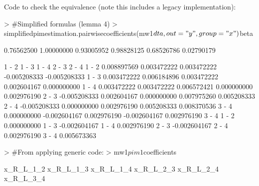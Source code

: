 \documentclass[12pt]{article}
\begin{document}
Code to check the equivalence (note this includes a legacy implementation):
\begin{Schunk}
\begin{Sinput}
> 	#Simplified formulas (lemma 4)
> 	simplifiedpimestimation.pairwisecoefficients(mw1$dta, out="y", group="x")$beta
\end{Sinput}
\begin{Soutput}
[1] 0.76562500 1.00000000 0.93005952 0.98828125 0.68526786 0.02790179
\end{Soutput}
\begin{Soutput}
             1 - 2        1 - 3       1 - 4        2 - 3        2 - 4
1 - 2  0.008897569  0.003472222 0.003472222 -0.005208333 -0.005208333
1 - 3  0.003472222  0.006184896 0.003472222  0.002604167  0.000000000
1 - 4  0.003472222  0.003472222 0.006572421  0.000000000  0.002976190
2 - 3 -0.005208333  0.002604167 0.000000000  0.007975260  0.005208333
2 - 4 -0.005208333  0.000000000 0.002976190  0.005208333  0.008370536
3 - 4  0.000000000 -0.002604167 0.002976190 -0.002604167  0.002976190
             3 - 4
1 - 2  0.000000000
1 - 3 -0.002604167
1 - 4  0.002976190
2 - 3 -0.002604167
2 - 4  0.002976190
3 - 4  0.005673363
\end{Soutput}
\begin{Sinput}
> 	#From applying generic code:
> 	mw1$pim1$coefficients
\end{Sinput}
\begin{Soutput}
 x_R_L_1_2  x_R_L_1_3  x_R_L_1_4  x_R_L_2_3  x_R_L_2_4  x_R_L_3_4 

\end{Soutput}
\end{Schunk}
\end{document}
